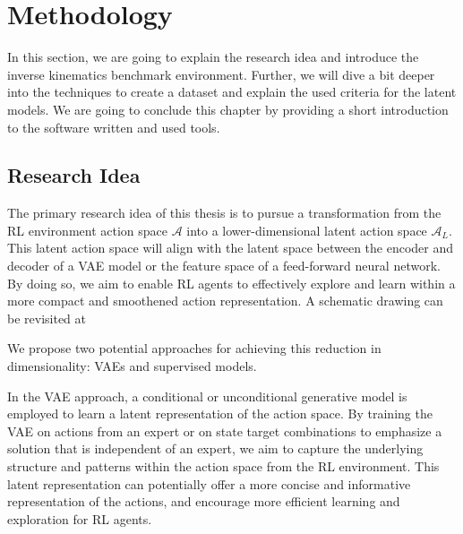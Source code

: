 \chapter{Methodology}\label{chap:Methodology}

In this section, we are going to explain the research idea and introduce the inverse kinematics benchmark environment. Further, we will dive a bit deeper into the techniques to create a dataset and explain the used criteria for the latent models. We are going to conclude this chapter by providing a short introduction to the software written and used tools.

\section{Research Idea}

The primary research idea of this thesis is to pursue a transformation from the RL environment action space $\mathcal{A}$ into a lower-dimensional latent action space $\mathcal{A}_L$. This latent action space will align with the latent space between the encoder and decoder of a VAE model or the feature space of a feed-forward neural network. By doing so, we aim to enable RL agents to effectively explore and learn within a more compact and smoothened action representation. A schematic drawing can be revisited at 

We propose two potential approaches for achieving this reduction in dimensionality: VAEs and supervised models.

In the VAE approach, a conditional or unconditional generative model is employed to learn a latent representation of the action space. By training the VAE on actions from an expert or on state target combinations to emphasize a solution that is independent of an expert, we aim to capture the underlying structure and patterns within the action space from the RL environment. This latent representation can potentially offer a more concise and informative representation of the actions, and encourage more efficient learning and exploration for RL agents.

